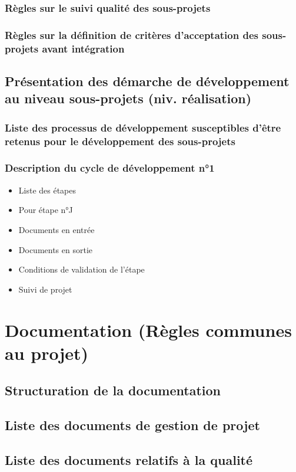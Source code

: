 \subsubsection{Règles sur le suivi qualité des sous-projets}
\subsubsection{Règles sur la définition de critères d’acceptation des sous-projets avant intégration}
\subsection{Présentation des démarche de développement au niveau sous-projets (niv. réalisation)}
\subsubsection{Liste des processus de développement susceptibles d’être retenus pour le développement des sous-projets}
\subsubsection{Description du cycle de développement n°1}
\begin{itemize}
  \item Liste des étapes
  \item Pour étape n°J
  \item Documents en entrée
  \item Documents en sortie
  \item Conditions de validation de l’étape
  \item Suivi de projet
\end{itemize}
 
\section{Documentation (Règles communes au projet)}
\subsection{Structuration de la documentation}
\subsection{Liste des documents de gestion de projet}
\subsection{Liste des documents relatifs à la qualité}
